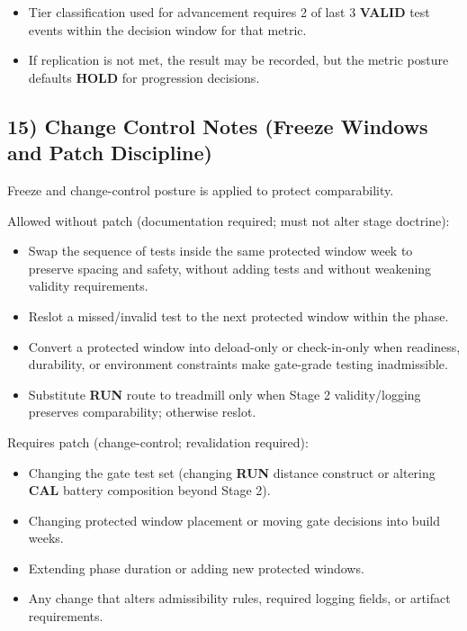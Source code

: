 \documentclass[10pt]{article}
\begin{document}
\begin{itemize}
\item Tier classification used for advancement requires 2 of last 3 \textbf{VALID} test events within the decision window for that metric.
\item If replication is not met, the result may be recorded, but the metric posture defaults \textbf{HOLD} for progression decisions.
\end{itemize}

\subsection*{15) Change Control Notes (Freeze Windows and Patch Discipline)}

Freeze and change-control posture is applied to protect comparability.

Allowed without patch (documentation required; must not alter stage doctrine):

\begin{itemize}
\item Swap the sequence of tests inside the same protected window week to preserve spacing and safety, without adding tests and without weakening validity requirements.
\item Reslot a missed/invalid test to the next protected window within the phase.
\item Convert a protected window into deload-only or check-in-only when readiness, durability, or environment constraints make gate-grade testing inadmissible.
\item Substitute \textbf{RUN} route to treadmill only when Stage 2 validity/logging preserves comparability; otherwise reslot.
\end{itemize}

Requires patch (change-control; revalidation required):

\begin{itemize}
\item Changing the gate test set (changing \textbf{RUN} distance construct or altering \textbf{CAL} battery composition beyond Stage 2).
\item Changing protected window placement or moving gate decisions into build weeks.
\item Extending phase duration or adding new protected windows.
\item Any change that alters admissibility rules, required logging fields, or artifact requirements.
\end{itemize}
\end{document}
